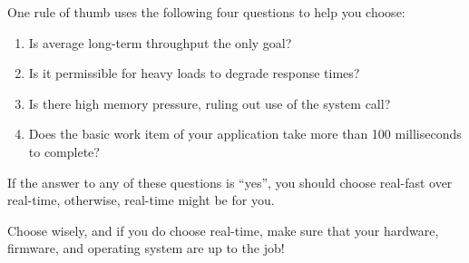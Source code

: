 One rule of thumb uses the following four questions to help you choose:

\begin{enumerate}
\item	Is average long-term throughput the only goal?
\item	Is it permissible for heavy loads to degrade response times?
\item	Is there high memory pressure, ruling out use of
	the  system call?
\item	Does the basic work item of your application take more than
	100 milliseconds to complete?
\end{enumerate}

If the answer to any of these questions is ``yes'', you should choose
real-fast over real-time, otherwise, real-time might be for you.

Choose wisely, and if you do choose real-time, make sure that your
hardware, firmware, and operating system are up to the job!
